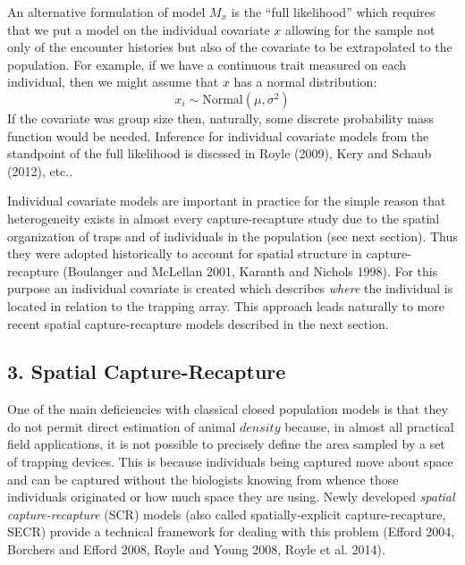 \documentclass{book}
\begin{document}
An alternative formulation of model $M_x$ is the ``full likelihood''
which requires that we put a model on the individual covariate $x$
allowing for the sample not only of the encounter histories but also
of the covariate to be extrapolated to the population.
 For example, if we have a continuous trait measured on
each individual, then we might assume that $x$ has a normal distribution:
\[
x_{i} \sim \mbox{Normal}(\mu,\sigma^{2})
\]
If the covariate was group size then, naturally, some discrete
probability mass function would be needed. Inference for individual
covariate models from the standpoint of the  full likelihood is
discssed in Royle (2009), Kery and Schaub (2012), etc..

Individual covariate models are important in practice for the simple
reason that heterogeneity exists in almost every capture-recapture
study due to the spatial organization of traps and of individuals in
the population (see next section). Thus they were adopted historically
to account for spatial structure in capture-recapture (Boulanger and
McLellan 2001, Karanth and Nichols 1998).  For this purpose an
individual covariate is created which describes {\it where} the
individual is located in relation to the trapping array.  This
approach leads naturally to more recent spatial capture-recapture
models described in the next section.



\subsection*{3. Spatial Capture-Recapture}

One of the main deficiencies with classical closed population models
is that they do not permit direct estimation of animal $density$
because, in almost all practical field applications, it is not
possible to precisely define the area sampled by a set of trapping
devices. This is because individuals being captured  move about
space and can be captured without the biologists knowing from whence
those individuals originated or how much space they are using. Newly
developed {\it spatial capture-recapture} (SCR) models (also called
spatially-explicit capture-recapture, SECR) provide a technical framework for
dealing with this problem (Efford 2004, Borchers and Efford 2008,
Royle and Young 2008, Royle et al. 2014). 
\end{document}
